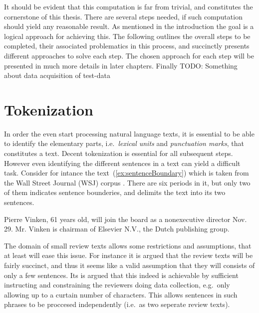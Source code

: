  It should be evident that this computation is far from trivial, and constitutes the cornerstone of this thesis. There are several steps needed, if such computation should yield any reasonable result. As mentioned in the introduction the goal is a logical approach for achieving this. The following outlines the overall steps to be completed, their associated problematics in this process, and succinctly presents different approaches to solve each step. The chosen approach for each step will be presented in much more details in later chapters. Finally TODO: Something about data acquisition of test-data

\section{Tokenization}
In order the even start processing natural language texts, it is essential to be able to identify the elementary parts, i.e.\ \emph{lexical units} and \emph{punctuation marks}, that constitutes a text. Decent tokenization is essential for all subsequent steps. However even identifying the different sentences in a text can yield a difficult task. Consider for intance the text~(\ref{ex:sentenceBoundary}) which is taken from the Wall Street Journal (WSJ) corpus \cite{wsjCorpus}. There are six periods in it, but only two of them indicates sentence bounderies, and delimits the text into its two sentences.

\begin{numquote}
  Pierre Vinken, 61 years old, will join the board as a nonexecutive director Nov. 29. Mr. Vinken is chairman of Elsevier N.V., the Dutch publishing group.  
  \label{ex:sentenceBoundary}
\end{numquote}

The domain of small review texts allows some restrictions and assumptions, that at least will ease this issue. For instance it is argued that the review texts will be fairly succinct, and thus it seems like a valid assumption that they will consists of only a few sentences. Its is argued that this indeed is achievable by sufficient instructing and constraining the reviewers doing data collection, e.g.\ only allowing up to a curtain number of characters. This allows sentences in such phrases to be proccesed independently (i.e.\ as two seperate review texts).

